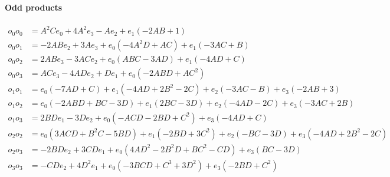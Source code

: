 \documentclass[11pt]{article}
\begin{document}
\paragraph{Odd products}
\begin{align}
o_0 o_0 &=A^{2} C e_{0} + 4 A^{2} e_{3} - A e_{2} + e_{1} \left(- 2 A B + 1\right)\tag{GB15a}\\
o_0 o_1 &=- 2 A B e_{2} + 3 A e_{3} + e_{0} \left(- 4 A^{2} D + A C\right) + e_{1} \left(- 3 A C + B\right)\tag{GB15b}\\
o_0 o_2 &=2 A B e_{3} - 3 A C e_{2} + e_{0} \left(A B C - 3 A D\right) + e_{1} \left(- 4 A D + C\right)\tag{GB15c}\\
o_0 o_3 &=A C e_{3} - 4 A D e_{2} + D e_{1} + e_{0} \left(- 2 A B D + A C^{2}\right)\tag{GB15d}\\
o_1 o_1 &=e_{0} \left(- 7 A D + C\right) + e_{1} \left(- 4 A D + 2 B^{2} - 2 C\right) + e_{2} \left(- 3 A C - B\right) + e_{3} \left(- 2 A B + 3\right)\tag{GB15e}\\
o_1 o_2 &=e_{0} \left(- 2 A B D + B C - 3 D\right) + e_{1} \left(2 B C - 3 D\right) + e_{2} \left(- 4 A D - 2 C\right) + e_{3} \left(- 3 A C + 2 B\right)\tag{GB15f}\\
o_1 o_3 &=2 B D e_{1} - 3 D e_{2} + e_{0} \left(- A C D - 2 B D + C^{2}\right) + e_{3} \left(- 4 A D + C\right)\tag{GB15g}\\
o_2 o_2 &=e_{0} \left(3 A C D + B^{2} C - 5 B D\right) + e_{1} \left(- 2 B D + 3 C^{2}\right) + e_{2} \left(- B C - 3 D\right) + e_{3} \left(- 4 A D + 2 B^{2} - 2 C\right)\tag{GB15h}\\
o_2 o_3 &=- 2 B D e_{2} + 3 C D e_{1} + e_{0} \left(4 A D^{2} - 2 B^{2} D + B C^{2} - C D\right) + e_{3} \left(B C - 3 D\right)\tag{GB15i}\\
o_3 o_3 &=- C D e_{2} + 4 D^{2} e_{1} + e_{0} \left(- 3 B C D + C^{3} + 3 D^{2}\right) + e_{3} \left(- 2 B D + C^{2}\right)\tag{GB15j}
\end{align}
\end{document}
